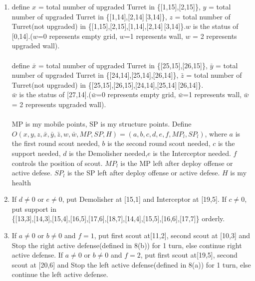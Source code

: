 \documentclass[12pt]{article}
\begin{document}
\begin{enumerate}
\begin{enumerate}
\item define $x$ = total number of upgraded Turret in \{[1,15],[2,15]\}, $y$ = total number of upgraded Turret in \{[1,14],[2,14]\,[3,14]\}, $z$ = total number of Turret(not upgraded) in  \{[1,15],[2,15],[1,14],[2,14]\,[3,14]\}.$w$ is the status of [0,14].($w$=0 represents empty grid, $w$=1 represents wall, $w$ = 2 represents upgraded wall).\\\\define $\bar{x}$ = total number of upgraded Turret in \{[25,15],[26,15]\}, $\bar{y}$ = total number of upgraded Turret in \{[24,14],[25,14],[26,14]\}, $\bar{z}$ = total number of Turret(not upgraded) in  \{[25,15],[26,15],[24,14],[25,14]\,[26,14]\}.\\$\bar{w}$ is the status of [27,14].($\bar{w}$=0 represents empty grid, $\bar{w}$=1 represents wall, $\bar{w}$ = 2 represents upgraded wall).\\ \\MP is my mobile points, SP is my structure points. Define\\ $O(x,y,z,\bar{x},\bar{y},\bar{z},w,\bar{w},MP,SP,H) = (a,b,c,d,e,f,MP_l,SP_l)$, where $a$ is the first round scout needed, $b$ is the second round scout needed, $c$ is the support needed, $d$ is the Demolisher needed,$e$ is the Interceptor needed. $f$ controls the position of scout. $MP_l$ is the MP left after deploy offense or active defese. $SP_l$ is the SP left after deploy offense or active defese. $H$ is my health
\item If $d \neq 0$ or $e \neq 0$, put Demolisher at  [15,1] and Interceptor at [19,5]. If $c \neq 0$, put support in\\ \{[13,3],[14,3],[15,4],[16,5],[17,6],[18,7],[14,4],[15,5],[16,6],[17,7]\} orderly.
\item If $a \neq 0$ or $b \neq 0$ and $f =1$, put first scout at[11,2], second scout at [10,3] and Stop the right active defense(defined in 8(b)) for 1 turn, else continue right active defense. If $a \neq 0$ or $b \neq 0$ and $f =2$, put first scout at[19,5], second scout at [20,6] and Stop the left active defense(defined in 8(a)) for 1 turn, else continue the left active defense.
\end{enumerate}
\end{enumerate}
\end{document}
